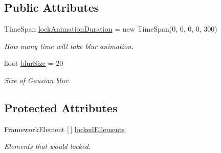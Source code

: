 \subsection*{Public Attributes}
\begin{DoxyCompactItemize}
\item 
Time\+Span \mbox{\hyperlink{class_wpf_handler_1_1_u_i_1_1_controls_1_1_lock_screen_aa2733098fb7a92be1c98a6b0ac47972c}{lock\+Animation\+Duration}} = new Time\+Span(0, 0, 0, 0, 300)
\begin{DoxyCompactList}\small\item\em How many time will take blur animation. \end{DoxyCompactList}\item 
float \mbox{\hyperlink{class_wpf_handler_1_1_u_i_1_1_controls_1_1_lock_screen_a5152e45504e88316e8d76753577ea4b5}{blur\+Size}} = 20
\begin{DoxyCompactList}\small\item\em Size of Gausian blur. \end{DoxyCompactList}\end{DoxyCompactItemize}
\subsection*{Protected Attributes}
\begin{DoxyCompactItemize}
\item 
Framework\+Element \mbox{[}$\,$\mbox{]} \mbox{\hyperlink{class_wpf_handler_1_1_u_i_1_1_controls_1_1_lock_screen_a6c0e4649ba3a27b7e55d32ddf093d4dd}{locked\+Ellements}}
\begin{DoxyCompactList}\small\item\em Elements that would locked. \end{DoxyCompactList}\end{DoxyCompactItemize}
